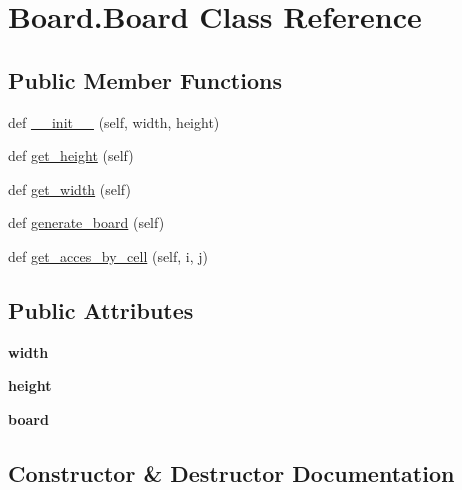 \hypertarget{class_board_1_1_board}{}\section{Board.\+Board Class Reference}
\label{class_board_1_1_board}
\subsection*{Public Member Functions}
\begin{DoxyCompactItemize}
\item 
def \mbox{\hyperlink{class_board_1_1_board_a4e5fe775dd732dca12ba2f24f5e33cd0}{\+\_\+\+\_\+init\+\_\+\+\_\+}} (self, width, height)
\item 
def \mbox{\hyperlink{class_board_1_1_board_a6134b116a4421868d9b70a90cae3cf6a}{get\+\_\+height}} (self)
\item 
def \mbox{\hyperlink{class_board_1_1_board_a5461757505c80b532af77cc6a651c7a7}{get\+\_\+width}} (self)
\item 
def \mbox{\hyperlink{class_board_1_1_board_a6c6aa64d586b48c8cbf7942a28ef4fba}{generate\+\_\+board}} (self)
\item 
def \mbox{\hyperlink{class_board_1_1_board_a8c672c7842189de03079a86c757244d7}{get\+\_\+acces\+\_\+by\+\_\+cell}} (self, i, j)
\end{DoxyCompactItemize}
\subsection*{Public Attributes}
\begin{DoxyCompactItemize}
\item 
\mbox{\label{class_board_1_1_board_a354a175ae1f399098ac23ed37c58a3f2}} 
{\bfseries width}
\item 
\mbox{\label{class_board_1_1_board_a288daa852b69c17ecbabab9af6dac15a}} 
{\bfseries height}
\item 
\mbox{\label{class_board_1_1_board_ad18dab28d51fbe8bbf93036546741a0b}} 
{\bfseries board}
\end{DoxyCompactItemize}


\subsection{Constructor \& Destructor Documentation}
\mbox{\label{class_board_1_1_board_a4e5fe775dd732dca12ba2f24f5e33cd0}} 
